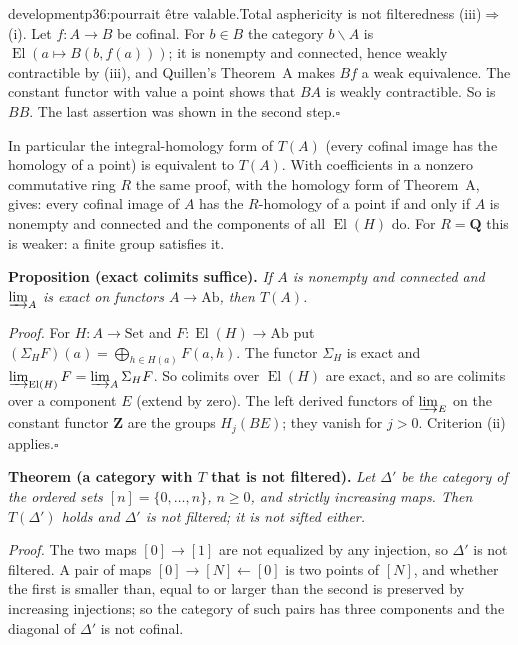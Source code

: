 \begin{dcomment}{development}{p36:pourrait être valable.}{Total asphericity is not filteredness}
(iii)$\Rightarrow$(i). Let $f:A\to B$ be cofinal. For $b\in B$ the category $b\backslash A$ is $\operatorname{El}(a\mapsto B(b,f(a)))$; it is nonempty and connected, hence weakly contractible by (iii), and Quillen's Theorem~A makes $Bf$ a weak equivalence. The constant functor with value a point shows that $BA$ is weakly contractible. So is $BB$. The last assertion was shown in the second step.\hfill$\square$

In particular the integral-homology form of $T(A)$ (every cofinal image has the homology of a point) is equivalent to $T(A)$. With coefficients in a nonzero commutative ring $R$ the same proof, with the homology form of Theorem~A, gives: every cofinal image of $A$ has the $R$-homology of a point if and only if $A$ is nonempty and connected and the components of all $\operatorname{El}(H)$ do. For $R=\mathbf Q$ this is weaker: a finite group satisfies it.

\textbf{Proposition (exact colimits suffice).}\ours
\textit{If $A$ is nonempty and connected and $\varinjlim_A$ is exact on functors $A\to\mathrm{Ab}$, then $T(A)$.}

\textit{Proof.}
For $H:A\to\mathrm{Set}$ and $F:\operatorname{El}(H)\to\mathrm{Ab}$ put $(\Sigma_HF)(a)=\bigoplus_{h\in H(a)}F(a,h)$. The functor $\Sigma_H$ is exact and $\varinjlim_{\operatorname{El}(H)}F=\varinjlim_A\Sigma_HF$. So colimits over $\operatorname{El}(H)$ are exact, and so are colimits over a component $E$ (extend by zero). The left derived functors of $\varinjlim_E$ on the constant functor $\mathbf Z$ are the groups $H_j(BE)$; they vanish for $j>0$. Criterion (ii) applies.\hfill$\square$

\textbf{Theorem (a category with $T$ that is not filtered).}\ours
\textit{Let $\Delta'$ be the category of the ordered sets $[n]=\{0,\dots,n\}$, $n\geq0$, and strictly increasing maps. Then $T(\Delta')$ holds and $\Delta'$ is not filtered; it is not sifted either.}

\textit{Proof.}
The two maps $[0]\to[1]$ are not equalized by any injection, so $\Delta'$ is not filtered. A pair of maps $[0]\to[N]\leftarrow[0]$ is two points of $[N]$, and whether the first is smaller than, equal to or larger than the second is preserved by increasing injections; so the category of such pairs has three components and the diagonal of $\Delta'$ is not cofinal.


\end{dcomment}
